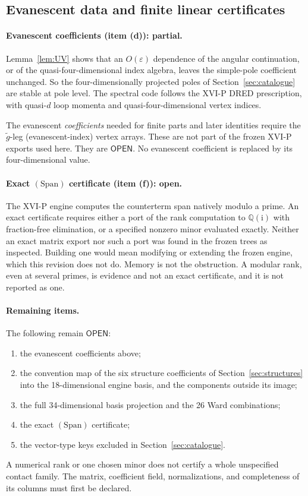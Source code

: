 \documentclass[11pt,a4paper]{article}
\newcommand{\ii}{\mathrm i}
\newcommand{\Span}{(\mathrm{Span})}
\newcommand{\eps}{\varepsilon}
\newcommand{\OPEN}{\textsf{OPEN}}
\theoremstyle{plain}
\theoremstyle{definition}
\theoremstyle{remark}
\numberwithin{equation}{section}
\begin{document}
\subsection{Evanescent data and finite linear certificates}

\paragraph{Evanescent coefficients (item (d)): partial.}
Lemma~\ref{lem:UV} shows that an \(O(\eps)\) dependence of the
angular continuation, or of the quasi-four-dimensional index
algebra, leaves the simple-pole coefficient unchanged.
So the four-dimensionally projected poles of
Section~\ref{sec:catalogue} are stable at pole level.
The spectral code follows the XVI-P DRED prescription, with
quasi-\(d\) loop momenta and quasi-four-dimensional vertex indices.

The evanescent \emph{coefficients} needed for finite parts and
later identities require the \(\tilde g\)-leg (evanescent-index)
vertex arrays.
These are not part of the frozen XVI-P exports used here.
They are \(\OPEN\).
No evanescent coefficient is replaced by its four-dimensional value.

\paragraph{Exact \(\Span\) certificate (item (f)): open.}
The XVI-P engine computes the counterterm span natively modulo a
prime.
An exact certificate requires either a port of the rank computation
to \(\mathbb Q(\ii)\) with fraction-free elimination, or a
specified nonzero minor evaluated exactly.
Neither an exact matrix export nor such a port was found in the
frozen trees as inspected.
Building one would mean modifying or extending the frozen engine,
which this revision does not do.
Memory is not the obstruction.
A modular rank, even at several primes, is evidence and not an
exact certificate, and it is not reported as one.

\paragraph{Remaining items.}
The following remain \(\OPEN\):
\begin{enumerate}[label=\textup{(\roman*)}]
\item the evanescent coefficients above;
\item the convention map of the six structure coefficients of
Section~\ref{sec:structures} into the 18-dimensional engine basis,
and the components outside its image;
\item the full 34-dimensional basis projection and the 26 Ward
combinations;
\item the exact \(\Span\) certificate;
\item the vector-type keys excluded in Section~\ref{sec:catalogue}.
\end{enumerate}
A numerical rank or one chosen minor does not certify a whole
unspecified contact family. The matrix, coefficient field,
normalizations, and completeness of its columns must first be
declared.
\end{document}
